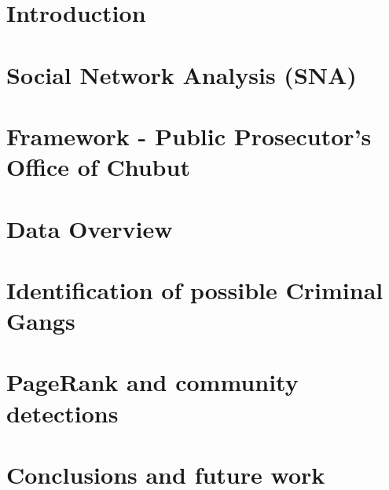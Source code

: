 \documentclass[runningheads]{llncs}
\begin{document}
%

\maketitle              %

%

%
\section{Introduction}


\section{Social Network Analysis (SNA)}


\section{Framework - Public Prosecutor's Office of Chubut}


\section{Data Overview}


\section{Identification of possible Criminal Gangs}


\section{PageRank and community detections}






\section{Conclusions and future work}



\end{document}
